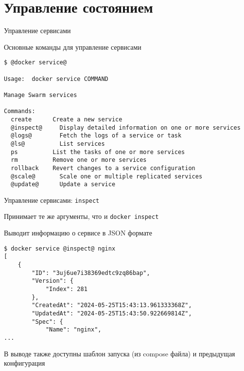 \section{Управление состоянием}\label{sec:management}
\begin{frame}[fragile]{Управление сервисами }

Основные команды для управление сервисами

\begin{tcolorbox-code}
\begin{lstlisting}[style=base]
$ @docker service@

Usage:  docker service COMMAND

Manage Swarm services

Commands:
  create      Create a new service
  @inspect@     Display detailed information on one or more services
  @logs@        Fetch the logs of a service or task
  @ls@          List services
  ps          List the tasks of one or more services
  rm          Remove one or more services
  rollback    Revert changes to a service configuration
  @scale@       Scale one or multiple replicated services
  @update@      Update a service
\end{lstlisting}
\end{tcolorbox-code}

\end{frame}

\begin{frame}[fragile]{Управление сервисами: \texttt{inspect} }

Принимает те же аргументы, что и \texttt{docker inspect}

Выводит информацию о сервисе в JSON формате

\begin{tcolorbox-code}
\begin{lstlisting}[style=base]
$ docker service @inspect@ nginx
[
    {
        "ID": "3uj6ue7i38369edtc9zq86bap",
        "Version": {
            "Index": 281
        },
        "CreatedAt": "2024-05-25T15:43:13.961333368Z",
        "UpdatedAt": "2024-05-25T15:43:50.922669814Z",
        "Spec": {
            "Name": "nginx",
...
\end{lstlisting}
\end{tcolorbox-code}

В выводе также доступны шаблон запуска (из compose файла) и предыдущая конфигурация

\end{frame}

